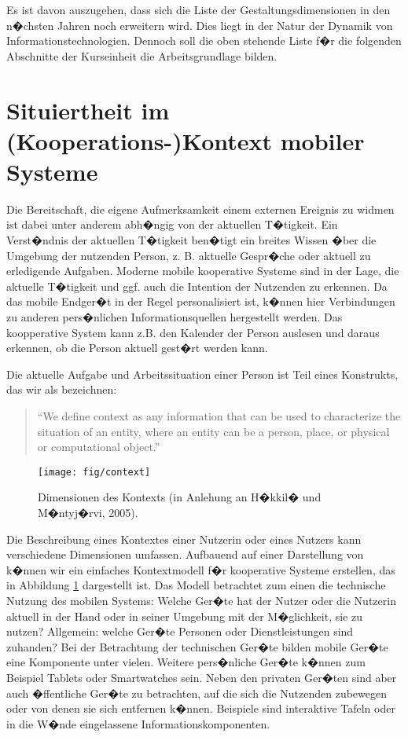 Es ist davon auszugehen, dass sich die Liste der Gestaltungsdimensionen in den n�chsten Jahren noch erweitern wird. Dies liegt in der Natur der Dynamik von Informationstechnologien. Dennoch soll die oben stehende Liste f�r die folgenden Abschnitte der Kurseinheit die Arbeitsgrundlage bilden.




\section{Situiertheit im (Kooperations-)Kontext mobiler Systeme}
Die Bereitschaft, die eigene Aufmerksamkeit einem externen Ereignis zu widmen ist dabei unter anderem abh�ngig von der aktuellen T�tigkeit. Ein Verst�ndnis der aktuellen T�tigkeit ben�tigt ein breites Wissen �ber die Umgebung der nutzenden Person, z. B. aktuelle Gespr�che oder aktuell zu erledigende Aufgaben. Moderne mobile kooperative Systeme sind in der Lage, die aktuelle T�tigkeit und ggf. auch die Intention der Nutzenden zu erkennen. Da das mobile Endger�t in der Regel personalisiert ist, k�nnen hier Verbindungen zu anderen pers�nlichen Informationsquellen hergestellt werden. Das koopperative System kann z.B. den Kalender der Person auslesen und daraus erkennen, ob die Person aktuell gest�rt werden kann. 

Die aktuelle Aufgabe und Arbeitssituation einer Person ist Teil eines  Konstrukts, das wir als  bezeichnen:

\begin{quote}
``We define context as any information that can be used to characterize the situation of an entity, where an entity can be a person, place, or physical or computational object.''  
\end{quote}

\begin{figure}
\centering
\texttt{[image: fig/context]}
\caption{Dimensionen des Kontexts (in Anlehung an H�kkil� und M�ntyj�rvi, 2005).}
\label{Kontextmodell}
\end{figure}

Die Beschreibung eines Kontextes einer Nutzerin oder eines Nutzers kann verschiedene Dimensionen umfassen. Aufbauend auf einer Darstellung von \citet{Hakkila2005} k�nnen wir ein einfaches Kontextmodell f�r kooperative Systeme erstellen, das in Abbildung \ref{Kontextmodell} dargestellt ist.
\newpage
Das Modell betrachtet zum einen die technische Nutzung des mobilen Systems: Welche Ger�te hat der Nutzer oder die Nutzerin aktuell in der Hand oder in seiner Umgebung mit der M�glichkeit, sie zu nutzen? Allgemein: welche Ger�te Personen oder Dienstleistungen sind zuhanden? Bei der Betrachtung der technischen Ger�te bilden mobile Ger�te eine Komponente unter vielen. Weitere pers�nliche Ger�te k�nnen zum Beispiel Tablets oder Smartwatches sein. Neben den privaten Ger�ten sind aber auch �ffentliche Ger�te zu betrachten, auf die sich die Nutzenden zubewegen oder von denen sie sich entfernen k�nnen. Beispiele sind interaktive Tafeln oder in die W�nde eingelassene Informationskomponenten. 

